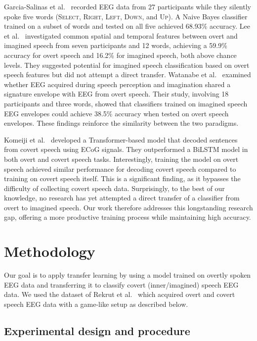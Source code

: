 \documentclass[onecolumn]{IEEEtran}
\begin{document}
Garcia-Salinas et al.~\cite{garcia2019transfer} recorded EEG data from 27 participants
while they silently spoke five words (\textsc{Select}, \textsc{Right}, \textsc{Left}, \textsc{Down}, and \textsc{Up}). 
A Naive Bayes classifier trained on a subset of words and tested on all five achieved 68.93\% accuracy.
Lee et al.~\cite{lee2020eeg} investigated common spatial and temporal features 
between overt and imagined speech from seven participants and 12 words, 
achieving a 59.9\% accuracy for overt speech and 16.2\% for imagined speech, both above chance levels. 
They suggested potential for imagined speech classification based on overt speech features 
but did not attempt a direct transfer. 
Watanabe et al.~\cite{watanabe2020synchronization} examined whether 
EEG acquired during speech perception and imagination shared a signature envelope with EEG from overt speech. 
Their study, involving 18 participants and three words, showed that classifiers trained on imagined speech EEG envelopes 
could achieve 38.5\% accuracy when tested on overt speech envelopes. 
These findings reinforce the similarity between the two paradigms.

Komeiji et al.~\cite{komeiji2024feasibility} developed a Transformer-based model 
that decoded sentences from covert speech using ECoG signals. 
They outperformed a BiLSTM model in both overt and covert speech tasks. 
Interestingly, training the model on overt speech achieved similar performance for decoding covert speech 
compared to training on covert speech itself. 
This is a significant finding, as it bypasses the difficulty of collecting covert speech data. 
Surprisingly, to the best of our knowledge, no research has yet attempted 
a direct transfer of a classifier from overt to imagined speech. 
Our work therefore addresses this longstanding research gap, 
offering a more productive training process while maintaining high accuracy.

\section{Methodology}
\label{sec:Methodology}

Our goal is to apply transfer learning by using a model trained on overtly spoken EEG data 
and transferring it to classify covert (inner/imagined) speech EEG data. 
We used the dataset of Rekrut et al.~\cite{rekrut2022improving} 
which acquired overt and covert speech EEG data with a game-like setup as described below.

\subsection{Experimental design and procedure}
\end{document}
